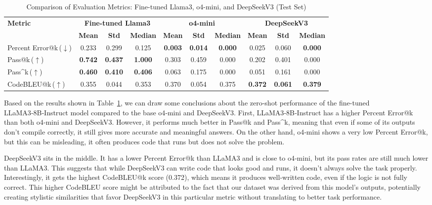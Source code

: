 \begin{table}[hbtp]
\centering
\setlength{\tabcolsep}{3.5pt}
\small
\begin{tabular}{l|ccc|ccc|ccc}
\toprule
\textbf{Metric} & \multicolumn{3}{c|}{\textbf{Fine-tuned Llama3}} & \multicolumn{3}{c|}{\textbf{o4-mini}} & \multicolumn{3}{c}{\textbf{DeepSeekV3}} \\
\cmidrule(lr){2-4} \cmidrule(lr){5-7} \cmidrule(lr){8-10}
 & \textbf{Mean} & \textbf{Std} & \textbf{Median} & \textbf{Mean} & \textbf{Std} & \textbf{Median} & \textbf{Mean} & \textbf{Std} & \textbf{Median} \\
 \midrule
Percent Error@k\,($\downarrow$)  & 0.233 & 0.299 & 0.125 & \textbf{0.003} & \textbf{0.014} & \textbf{0.000} & 0.025 & 0.060 & \textbf{0.000} \\
Pass@k\,($\uparrow$)           & \textbf{0.742} & \textbf{0.437} & \textbf{1.000} & 0.303 & 0.459 & 0.000 & 0.202 & 0.401 & 0.000 \\
Pass\textasciicircum k\,($\uparrow$)     & \textbf{0.460} & \textbf{0.410} & \textbf{0.406} & 0.063 & 0.175 & 0.000 & 0.051 & 0.161 & 0.000 \\
CodeBLEU@k\,($\uparrow$)     & 0.355 & 0.044 & 0.353 & 0.370 & 0.054 & 0.375 & \textbf{0.372} & \textbf{0.061} & \textbf{0.379} \\
\bottomrule
\end{tabular}
\caption{Comparison of Evaluation Metrics: Fine-tuned Llama3, o4-mini, and DeepSeekV3 (Test Set)}
\label{tab:combined_metrics}
\end{table}

Based on the results shown in Table~\ref{tab:combined_metrics}, we can draw some conclusions about the zero-shot performance of the fine-tuned LLaMA3‑8B‑Instruct model compared to the base o4‑mini and DeepSeekV3. First, LLaMA3‑8B‑Instruct has a higher Percent Error@k than both o4‑mini and DeepSeekV3. However, it performs much better in Pass@k and Pass\textasciicircum k, meaning that even if some of its outputs don't compile correctly, it still gives more accurate and meaningful answers. On the other hand, o4‑mini shows a very low Percent Error@k, but this can be misleading, it often produces code that runs but does not solve the problem.

DeepSeekV3 sits in the middle. It has a lower Percent Error@k than LLaMA3 and is close to o4‑mini, but its pass rates are still much lower than LLaMA3. This suggests that while DeepSeekV3 can write code that looks good and runs, it doesn't always solve the task properly. Interestingly, it gets the highest CodeBLEU@k score (0.372), which means it produces well-written code, even if the logic is not fully correct. This higher CodeBLEU score might be attributed to the fact that our dataset was derived from this model's outputs, potentially creating stylistic similarities that favor DeepSeekV3 in this particular metric without translating to better task performance.

